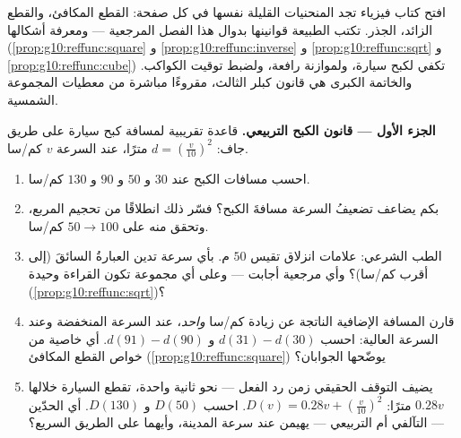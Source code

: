 \begin{problem}
\label{pb:g10:reffunc:1}
افتح كتاب فيزياء تجد المنحنيات القليلة نفسها في كل صفحة:
القطع المكافئ، والقطع الزائد،  الجذر. تكتب الطبيعة
قوانينها بدوال هذا الفصل المرجعية --- ومعرفة
أشكالها (\cref{prop:g10:reffunc:square} و
\cref{prop:g10:reffunc:inverse} و \cref{prop:g10:reffunc:sqrt} و
\cref{prop:g10:reffunc:cube}) تكفي لكبح سيارة، ولموازنة
رافعة، ولضبط توقيت الكواكب. والخاتمة الكبرى هي قانون كبلر
الثالث، مقروءًا مباشرة من معطيات المجموعة الشمسية.

\medskip
\noindent\textbf{الجزء الأول --- قانون الكبح التربيعي.}
قاعدة تقريبية لمسافة كبح سيارة على طريق جاف:
$d = \left(\frac{v}{10}\right)^{2}$ مترًا، عند السرعة $v$ كم/سا.
\begin{enumerate}
  \item احسب مسافات الكبح عند $30$ و $50$ و $90$ و
        $130$ كم/سا.
  \item بكم يضاعف تضعيفُ السرعة مسافةَ الكبح؟
        فسّر ذلك انطلاقًا من تحجيم  المربع،
        وتحقق منه على $50 \to 100$ كم/سا.
  \item الطب الشرعي: علامات انزلاق تقيس $50$ م. بأي سرعة
        تدين العبارةُ السائقَ (إلى أقرب كم/سا)؟ وأي
         مرجعية أجابت --- وعلى أي مجموعة تكون القراءة
        وحيدة (\cref{prop:g10:reffunc:sqrt})؟
  \item قارن المسافة الإضافية الناتجة عن زيادة كم/سا \emph{واحد}،
        عند السرعة المنخفضة وعند السرعة العالية: احسب
        $d(31) - d(30)$ و $d(91) - d(90)$. أي خاصية من خواص
        القطع المكافئ (\cref{prop:g10:reffunc:square}) يوضّحها
        الجوابان؟
  \item يضيف التوقف الحقيقي زمن رد الفعل --- نحو ثانية واحدة،
        تقطع السيارة خلالها $0.28v$ مترًا:
        $D(v) = 0.28v + \left(\frac{v}{10}\right)^2$. احسب
        $D(50)$ و $D(130)$. أي الحدّين --- التآلفي
        أم التربيعي --- يهيمن عند سرعة المدينة، وأيهما على
        الطريق السريع؟
\end{enumerate}


\end{problem}
